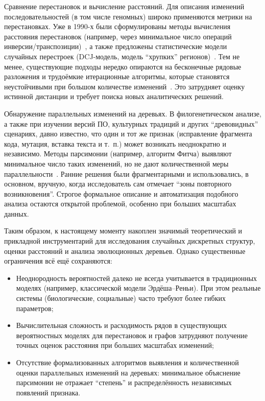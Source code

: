 Сравнение перестановок и вычисление расстояний.
Для описания изменений последовательностей (в том числе геномных) широко применяются метрики на перестановках.
Уже в 1990-х были сформулированы методы вычисления расстояния перестановок (например, через минимальное число операций инверсии/транспозиции)~\cite{yancopoulos2005,braga2010}, а также предложены статистические модели случайных перестроек (DCJ-модель, модель ``хрупких'' регионов)~\cite{Pevzner03,tannier2016}.
Тем не менее, существующие подходы нередко опираются на бесконечные рядовые разложения и трудоёмкие итерационные алгоритмы, которые становятся неустойчивыми при большом количестве изменений~\cite{tannier2016}.
Это затрудняет оценку истинной дистанции и требует поиска новых аналитических решений.  

Обнаружение параллельных изменений на деревьях. В филогенетическом анализе, а также при изучении версий ПО, культурных традиций и других ``древовидных'' сценариях, давно известно, что один и тот же признак (исправление фрагмента кода, мутация, вставка текста и т.~п.) может возникать неоднократно и независимо.  
Методы парсимонии (например, алгоритм Фитча) выявляют минимальное число таких изменений, но не дают количественной меры параллельности~\cite{Avdeyev2016}.
Ранние решения были фрагментарными и использовались, в основном, вручную, когда исследователь сам отмечает ``зоны повторного возникновения''. 
Строгое формальное описание и автоматизация подобного анализа остаются открытой проблемой, особенно при больших масштабах данных.  

Таким образом, к настоящему моменту накоплен значимый теоретический и прикладной инструментарий для исследования случайных дискретных структур, оценки расстояний и анализа эволюционных деревьев.  
Однако существенные ограничения всё ещё сохраняются:

\begin{itemize}
    \item Неоднородность вероятностей далеко не всегда учитывается в традиционных моделях (например, классической модели Эрдёша--Реньи). При этом реальные системы (биологические, социальные) часто требуют более гибких параметров;  
    \item Вычислительная сложность и расходимость рядов в существующих вероятностных моделях для перестановок и графов затрудняют получение точных оценок расстояния при больших масштабах изменений;  
    \item Отсутствие формализованных алгоритмов выявления и количественной оценки параллельных изменений на деревьях: минимальное объяснение парсимонии не отражает ``степень'' и распределённость независимых появлений признака.  
\end{itemize}

